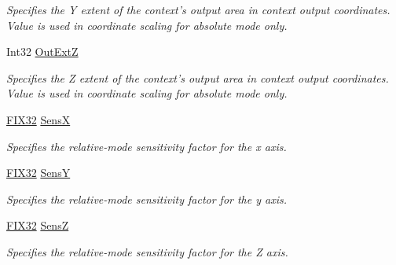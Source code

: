\begin{DoxyCompactItemize}
\begin{DoxyCompactList}\small\item\em Specifies the Y extent of the context's output area in context output coordinates. Value is used in coordinate scaling for absolute mode only. \item\end{DoxyCompactList}\item 
Int32 \hyperlink{class_wintab_d_n_1_1_c_wintab_context_a43c662cb2050c4a8f9cd0378fffd91e9}{OutExtZ}
\begin{DoxyCompactList}\small\item\em Specifies the Z extent of the context's output area in context output coordinates. Value is used in coordinate scaling for absolute mode only. \item\end{DoxyCompactList}\item 
\hyperlink{class_wintab_d_n_1_1_f_i_x32}{FIX32} \hyperlink{class_wintab_d_n_1_1_c_wintab_context_a07809637575a3df05e712040c0a3c724}{SensX}
\begin{DoxyCompactList}\small\item\em Specifies the relative-\/mode sensitivity factor for the x axis. \item\end{DoxyCompactList}\item 
\hyperlink{class_wintab_d_n_1_1_f_i_x32}{FIX32} \hyperlink{class_wintab_d_n_1_1_c_wintab_context_aa50f638174c4d1391705f2886f37c014}{SensY}
\begin{DoxyCompactList}\small\item\em Specifies the relative-\/mode sensitivity factor for the y axis. \item\end{DoxyCompactList}\item 
\hyperlink{class_wintab_d_n_1_1_f_i_x32}{FIX32} \hyperlink{class_wintab_d_n_1_1_c_wintab_context_a7ff3ee5c5c7085f2f92235fffffa3cd8}{SensZ}
\begin{DoxyCompactList}\small\item\em Specifies the relative-\/mode sensitivity factor for the Z axis. \item\end{DoxyCompactList}\item 

\end{DoxyCompactItemize}
